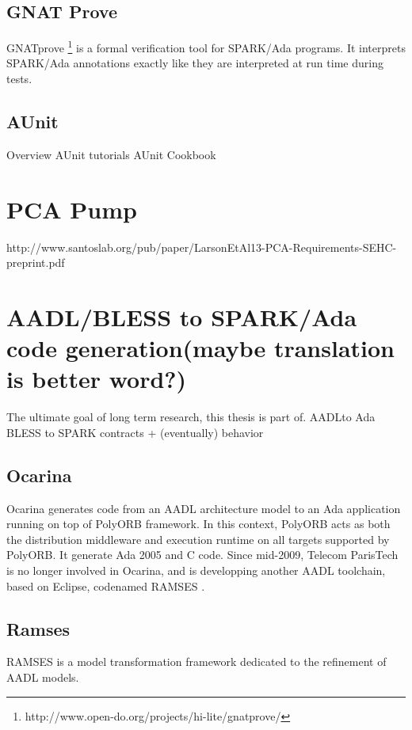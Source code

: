 \subsection{GNAT Prove}
\label{background:spark:gnatprove}
GNATprove \footnote{http://www.open-do.org/projects/hi-lite/gnatprove/} is a formal verification tool for SPARK/Ada programs. It interprets SPARK/Ada annotations exactly like they are interpreted at run time during tests.


\subsection{AUnit}
\label{background:spark:aunit}
Overview
AUnit tutorials \cite{AUnitTutorials:Online}
AUnit Cookbook \cite{AUnitCookbook:Online}



\section{PCA Pump}
\label{background:pcapump}
http://www.santoslab.org/pub/paper/LarsonEtAl13-PCA-Requirements-SEHC-preprint.pdf



\section{AADL/BLESS to SPARK/Ada code generation(maybe translation is better word?)}
\label{background:codegen}
The ultimate goal of long term research, this thesis is part of.
AADLto Ada
BLESS to SPARK contracts + (eventually) behavior


\subsection{Ocarina}
\label{background:codegen:ocarina}
Ocarina \cite{Ocarina:Paper,Ocarina:Paper} generates code from an AADL architecture model to an Ada application running on top of PolyORB framework. In this context, PolyORB acts as both the distribution middleware and execution runtime on all targets supported by PolyORB.
It generate Ada 2005 and C code.
Since mid-2009, Telecom ParisTech is no longer involved in Ocarina, and is developping another AADL toolchain, based on Eclipse, codenamed RAMSES \cite{Ocarina:About:Online}.


\subsection{Ramses}
\label{background:codegen:ramses}
RAMSES is a model transformation framework dedicated to the refinement of AADL models.
